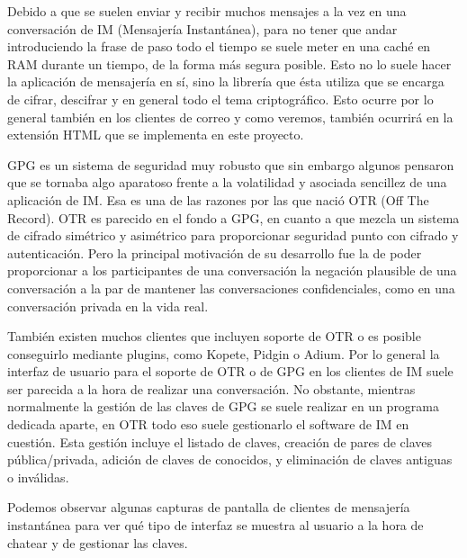 Debido a que se suelen enviar y recibir muchos mensajes a la vez en una conversación de IM (Mensajería Instantánea), para no tener que andar introduciendo la frase de paso todo el tiempo se suele meter en una caché en RAM durante un tiempo, de la forma más segura posible. Esto no lo suele hacer la aplicación de mensajería en sí, sino la librería que ésta utiliza que se encarga de cifrar, descifrar y en general todo el tema criptográfico. Esto ocurre por lo general también en los clientes de correo y como veremos, también ocurrirá en la extensión HTML que se implementa en este proyecto.

GPG es un sistema de seguridad muy robusto que sin embargo algunos pensaron que se tornaba algo aparatoso frente a la volatilidad y asociada sencillez de una aplicación de IM. Esa es una de las razones por las que nació OTR (Off The Record). OTR es parecido en el fondo a GPG, en cuanto a que mezcla un sistema de cifrado simétrico y asimétrico para proporcionar seguridad punto con cifrado y autenticación. Pero la principal motivación de su desarrollo fue la de poder proporcionar a los participantes de una conversación la negación plausible de una conversación a la par de mantener las conversaciones confidenciales, como en una conversación privada en la vida real.

También existen muchos clientes que incluyen soporte de OTR o es posible conseguirlo mediante plugins, como Kopete, Pidgin o Adium. Por lo general la interfaz de usuario para el soporte de OTR o de GPG en los clientes de IM suele ser parecida a la hora de realizar una conversación. No obstante, mientras normalmente la gestión de las claves de GPG se suele realizar en un programa dedicada aparte, en OTR todo eso suele gestionarlo el software de IM en cuestión. Esta gestión incluye el listado de claves, creación de pares de claves pública/privada, adición de claves de conocidos, y eliminación de claves antiguas o inválidas.


Podemos observar algunas capturas de pantalla de clientes de mensajería instantánea para ver qué tipo de interfaz se muestra al usuario a la hora de chatear y de gestionar las claves.

